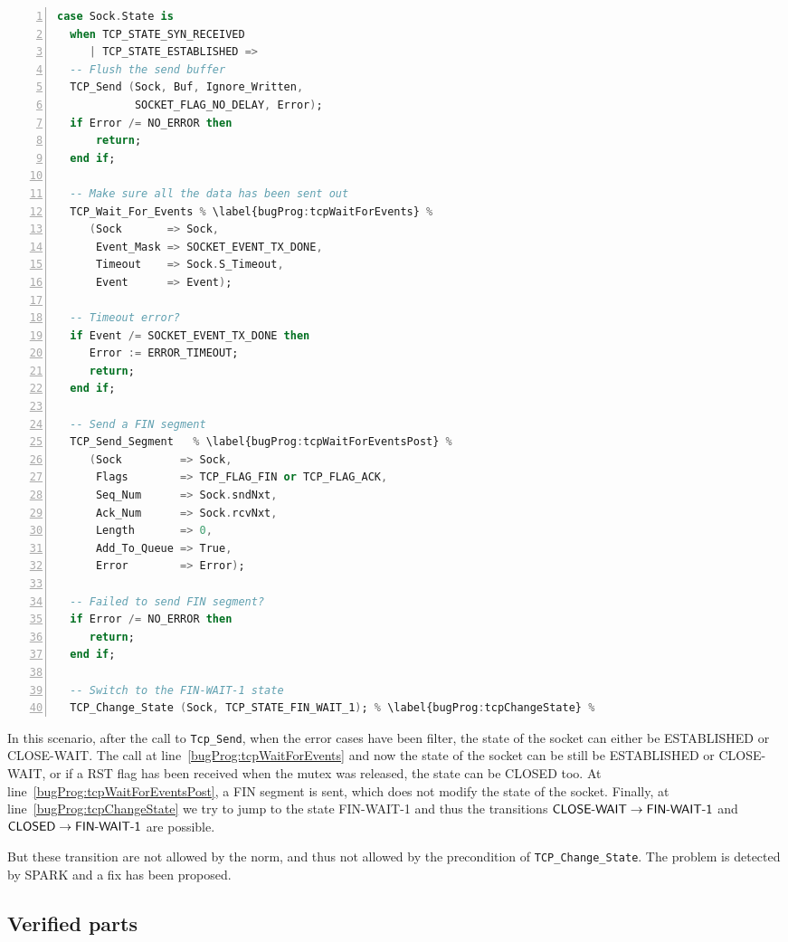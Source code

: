 \documentclass[conference]{IEEEtran}
\def\spark#1{\lstinline[language=Ada]{#1}}
\def\state#1{\textsf{\MakeUppercase{#1}}\xspace}
\def\sclosed{\state{closed}}
\def\sestab{\state{established}}
\def\sfwone{\state{fin-wait-1}}
\def\sclosew{\state{close-wait}}
\def\flag#1{\textsf{#1}\xspace}
\def\rst{\flag{RST}}
\def\fin{\flag{FIN}}
\begin{document}
\begin{lstlisting}[language=Ada, basicstyle=\footnotesize\ttfamily,
                    numbers=left, numberstyle=\tiny, escapechar=\%]
case Sock.State is
  when TCP_STATE_SYN_RECEIVED
     | TCP_STATE_ESTABLISHED =>
  -- Flush the send buffer
  TCP_Send (Sock, Buf, Ignore_Written,
            SOCKET_FLAG_NO_DELAY, Error);
  if Error /= NO_ERROR then
      return;
  end if;

  -- Make sure all the data has been sent out
  TCP_Wait_For_Events % \label{bugProg:tcpWaitForEvents} %
     (Sock       => Sock,
      Event_Mask => SOCKET_EVENT_TX_DONE,
      Timeout    => Sock.S_Timeout,
      Event      => Event);

  -- Timeout error?
  if Event /= SOCKET_EVENT_TX_DONE then
     Error := ERROR_TIMEOUT;
     return;
  end if;

  -- Send a FIN segment
  TCP_Send_Segment   % \label{bugProg:tcpWaitForEventsPost} %
     (Sock         => Sock,
      Flags        => TCP_FLAG_FIN or TCP_FLAG_ACK,
      Seq_Num      => Sock.sndNxt,
      Ack_Num      => Sock.rcvNxt,
      Length       => 0,
      Add_To_Queue => True,
      Error        => Error);

  -- Failed to send FIN segment?
  if Error /= NO_ERROR then
     return;
  end if;

  -- Switch to the FIN-WAIT-1 state
  TCP_Change_State (Sock, TCP_STATE_FIN_WAIT_1); % \label{bugProg:tcpChangeState} %
\end{lstlisting}

In this scenario, after the call to \spark{Tcp_Send}, when the error cases have
been filter, the state of the socket can either be \sestab or \sclosew. The call
at line~\ref{bugProg:tcpWaitForEvents} and now the state of the socket can be
still be \sestab or \sclosew, or if a \rst flag has been received when the mutex
was released, the state can be \sclosed too.
At line~\ref{bugProg:tcpWaitForEventsPost}, a \fin segment is sent, which does
not modify the state of the socket. Finally, at line~\ref{bugProg:tcpChangeState}
we try to jump to the state \sfwone and thus the transitions $\text{\sclosew}
\rightarrow \text{\sfwone}$ and $\text{\sclosed} \rightarrow \text{\sfwone}$ are
possible.

But these transition are not allowed by the norm, and thus not allowed by the
precondition of \spark{TCP_Change_State}. The problem is detected by SPARK and a fix
has been proposed.


\subsection{Verified parts}
\end{document}
